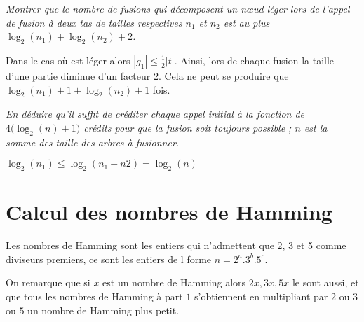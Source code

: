\begin{Exercise}[title = Nombre de fusions avec nœuds légers]\it 
Montrer que le nombre de fusions qui décomposent un nœud léger lors de l'appel de fusion à deux tas de tailles respectives $n_1$ et $n_2$ est au plus $\log_2(n_1) + \log_2(n_2) + 2$.
\end{Exercise}
\begin{Answer}
Dans le cas où  est léger alors $|g_1| \le \frac 12|t|$. Ainsi, lors de chaque fusion la taille d'une partie diminue d'un facteur 2. Cela ne peut se produire que $\log_2(n_1) + 1 + \log_2(n_2) + 1$ fois.
\end{Answer}
\begin{Exercise}[title = Crédits à fournir]\it 
En déduire qu'il suffit de créditer chaque appel initial à la fonction  de $4\bigl(\log_2(n) + 1\bigr)$ crédits pour que la fusion soit toujours possible ; $n$ est la somme des taille des arbres à fusionner.
\end{Exercise}
\begin{Answer}
$\log_2(n_1) \le \log_2(n_1+n2) = \log_2(n)$
\end{Answer}
\newpage
\section{Calcul des nombres de {\sc Hamming}}
Les nombres de {\sc Hamming} sont les entiers qui n'admettent que 2, 3 et 5 comme diviseurs premiers, ce sont les entiers de l forme $n = 2^a.3^b.5^c$.

On remarque que si $x$ est un nombre de {\sc Hamming} alors $2x,3x,5x$ le sont aussi, et que tous les nombres de {\sc Hamming} à part $1$ s'obtiennent en multipliant par $2$ ou $3$ ou $5$ un nombre de {\sc Hamming} plus petit.

